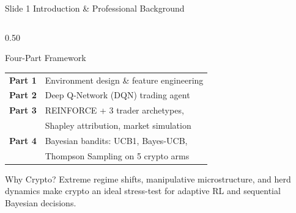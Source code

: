 \documentclass[aspectratio=169, 10pt]{beamer}
\begin{document}
\begin{frame}[t]{Slide 1 \quad Introduction \& Professional Background}
\begin{columns}[T]
  \begin{column}{0.50\textwidth}
    \begin{block}{Four-Part Framework}
    \vspace{2pt}
    \small
    \begin{tabular}{>{\bfseries\color{cornellred}}cl}
      Part 1 & Environment design \& feature engineering \\[2pt]
      Part 2 & Deep Q-Network (DQN) trading agent \\[2pt]
      Part 3 & REINFORCE + 3 trader archetypes, \\
             & Shapley attribution, market simulation \\[2pt]
      Part 4 & Bayesian bandits: UCB1, Bayes-UCB, \\
             & Thompson Sampling on 5 crypto arms \\
    \end{tabular}
    \vspace{2pt}
    \end{block}

    \vspace{6pt}
    \begin{alertblock}{Why Crypto?}
    \small
    Extreme regime shifts, manipulative microstructure,
    and herd dynamics make crypto an ideal stress-test
    for adaptive RL and sequential Bayesian decisions.
    \end{alertblock}
  \end{column}

\end{columns}
\end{frame}
\end{document}

